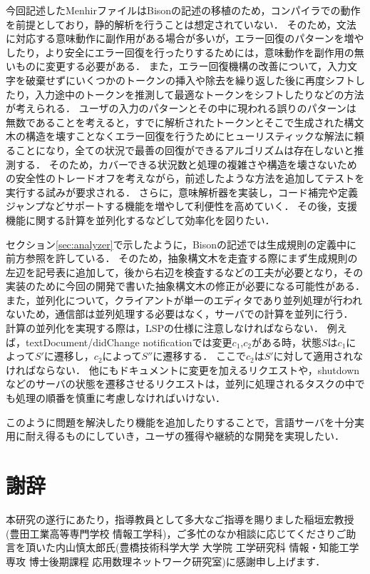 \documentclass[fontsize=9bp,twocolumn,column_gap=2.36zw,a4paper,report]{jlreq}
\begin{document}
今回記述したMenhirファイルはBisonの記述の移植のため，コンパイラでの動作を前提としており，静的解析を行うことは想定されていない．
そのため，文法に対応する意味動作に副作用がある場合が多いが，エラー回復のパターンを増やしたり，より安全にエラー回復を行ったりするためには，意味動作を副作用の無いものに変更する必要がある．
また，エラー回復機構の改善について，入力文字を破棄せずにいくつかのトークンの挿入や除去を繰り返した後に再度シフトしたり，入力途中のトークンを推測して最適なトークンをシフトしたりなどの方法が考えられる．
ユーザの入力のパターンとその中に現われる誤りのパターンは無数であることを考えると，すでに解析されたトークンとそこで生成された構文木の構造を壊すことなくエラー回復を行うためにヒューリスティックな解法に頼ることになり，全ての状況で最善の回復ができるアルゴリズムは存在しないと推測する．
そのため，カバーできる状況数と処理の複雑さや構造を壊さないための安全性のトレードオフを考えながら，前述したような方法を追加してテストを実行する試みが要求される．
さらに，意味解析器を実装し，コード補完や定義ジャンプなどサポートする機能を増やして利便性を高めていく．
その後，支援機能に関する計算を並列化するなどして効率化を図りたい．\par
セクション\ref{sec:analyzer}で示したように，Bisonの記述では生成規則の定義中に前方参照を許している．
そのため，抽象構文木を走査する際にまず生成規則の左辺を記号表に追加して，後から右辺を検査するなどの工夫が必要となり，その実装のために今回の開発で書いた抽象構文木の修正が必要になる可能性がある．
また，並列化について，クライアントが単一のエディタであり並列処理が行われないため，通信部は並列処理する必要はなく，サーバでの計算を並列に行う．
計算の並列化を実現する際は，LSPの仕様に注意しなければならない．
例えば，textDocument/didChange notificationでは変更\(c_1\),\(c_2\)がある時，状態\(S\)は\(c_1\)によって\(S'\)に遷移し，\(c_2\)によって\(S''\)に遷移する．
ここで\(c_2\)は\(S'\)に対して適用されなければならない．
他にもドキュメントに変更を加えるリクエストや，shutdownなどのサーバの状態を遷移させるリクエストは，並列に処理されるタスクの中でも処理の順番を慎重に考慮しなければいけない．\par
このように問題を解決したり機能を追加したりすることで，言語サーバを十分実用に耐え得るものにしていき，ユーザの獲得や継続的な開発を実現したい．
\newline

\chapter{謝辞}

本研究の遂行にあたり，指導教員として多大なご指導を賜りました稲垣宏教授(豊田工業高等専門学校 情報工学科)，ご多忙のなか相談に応じてくださりご助言を頂いた内山慎太郎氏(豊橋技術科学大学 大学院 工学研究科 情報・知能工学専攻 博士後期課程 応用数理ネットワーク研究室)に感謝申し上げます．
\newline
\newline
\newline
\newline
\newline
\end{document}

